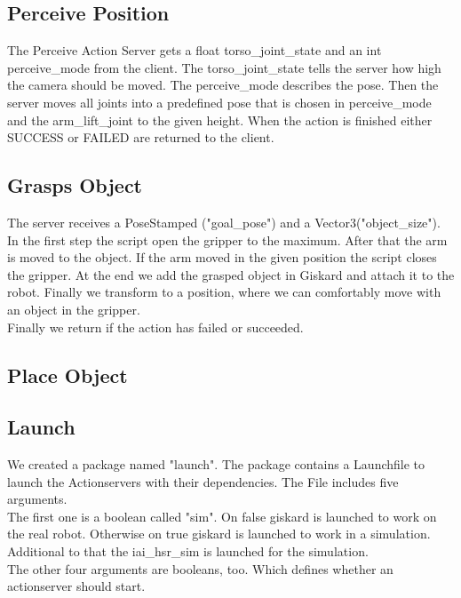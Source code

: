 \documentclass[main.tex]{subfiles}
\begin{document}
	\subsection{Perceive Position}
	The Perceive Action Server gets a float torso\_joint\_state and an int perceive\_mode from the client. The torso\_joint\_state tells the server how high the camera should be moved. The perceive\_mode describes the pose. Then the server moves all joints into a predefined pose that is chosen in perceive\_mode and the arm\_lift\_joint to the given height. When the action is finished either SUCCESS or FAILED are returned to the client.

	\vspace{1cm}
	
	\subsection{Grasps Object}
	The server receives a PoseStamped ("goal\_pose") and a Vector3("object\_size"). In the first step the script open the gripper to the maximum. After that the arm is moved to the object. If the arm moved in the given position the script closes the gripper. At the end we add the grasped object in Giskard and attach it to the robot. Finally we transform to a position, where we can comfortably move with an object in the gripper.\\
	Finally we return if the action has failed or succeeded.
	
	
	\vspace{1cm}
	
	\subsection{Place Object}
	
	\vspace{1cm}
	
	\subsection{Launch}
	We created a package named "launch". The package contains a Launchfile to launch the Actionservers with their dependencies. The File includes five arguments.\\
	The first one is a boolean called "sim". On false giskard is launched to work on the real robot. Otherwise on true giskard is launched to work in a simulation. Additional to that the iai\_hsr\_sim is launched for the simulation.\\
	The other four arguments are booleans, too. Which defines whether an actionserver should start. 
\end{document}
